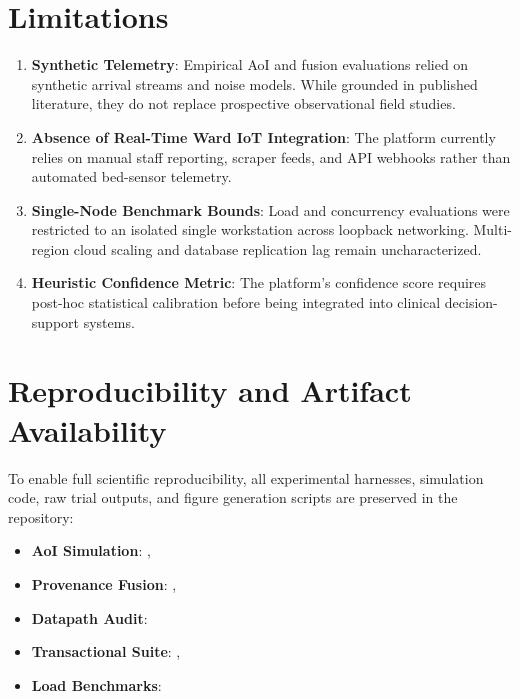 \documentclass[conference]{IEEEtran}
\begin{document}
\section{Limitations}

\begin{enumerate}
    \item \textbf{Synthetic Telemetry}: Empirical AoI and fusion evaluations relied on synthetic arrival streams and noise models. While grounded in published literature, they do not replace prospective observational field studies.
    \item \textbf{Absence of Real-Time Ward IoT Integration}: The platform currently relies on manual staff reporting, scraper feeds, and API webhooks rather than automated bed-sensor telemetry.
    \item \textbf{Single-Node Benchmark Bounds}: Load and concurrency evaluations were restricted to an isolated single workstation across loopback networking. Multi-region cloud scaling and database replication lag remain uncharacterized.
    \item \textbf{Heuristic Confidence Metric}: The platform's confidence score requires post-hoc statistical calibration before being integrated into clinical decision-support systems.
\end{enumerate}

\section{Reproducibility and Artifact Availability}

To enable full scientific reproducibility, all experimental harnesses, simulation code, raw trial outputs, and figure generation scripts are preserved in the repository:
\begin{itemize}
    \item \textbf{AoI Simulation}: , 
    \item \textbf{Provenance Fusion}: , 
    \item \textbf{Datapath Audit}: 
    \item \textbf{Transactional Suite}: , 
    \item \textbf{Load Benchmarks}: 
\end{itemize}
\end{document}
